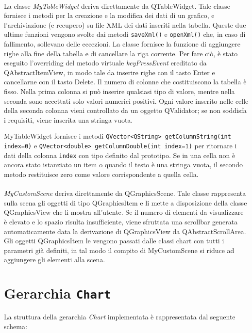 \documentclass[a4paper,10pt]{article}
\begin{document}
\paragraph{}
La classe \emph{MyTableWidget} deriva direttamente da QTableWidget. Tale classe fornisce i metodi per la creazione e la modifica dei dati di un grafico, e l'archiviazione (e recupero) su file XML dei dati inseriti nella tabella. Queste due ultime funzioni vengono svolte dai metodi \texttt{saveXml()} e \texttt{openXml()} che, in caso di fallimento, sollevano delle eccezioni. La classe fornisce la funzione di aggiungere righe alla fine della tabella e di cancellare la riga corrente. Per fare ciò, è stato eseguito l'overriding del metodo virtuale \emph{keyPressEvent} ereditato da QAbstractItemView, in modo tale da inserire righe con il tasto Enter e cancellarne con il tasto Delete. Il numero di colonne che costituiscono la tabella è fisso. Nella prima colonna si può inserire qualsiasi tipo di valore, mentre nella seconda sono accettati solo valori numerici positivi. Ogni valore inserito nelle celle della seconda colonna vieni controllato da un oggetto QValidator; se non soddisfa i requisiti, viene inserita una stringa vuota.

MyTableWidget fornisce i metodi \texttt{QVector<QString> getColumnString(int index=0)} e \texttt{QVector<double> getColumnDouble(int index=1)} per ritornare i dati della colonna \texttt{index} con tipo definito dal prototipo. Se in una cella non è ancora stato istanziato un item o quando il testo è una stringa vuota, il secondo metodo restituisce zero come valore corrispondente a quella cella.

\paragraph{}
\emph{MyCustomScene} deriva direttamente da QGraphicsScene. Tale classe rappresenta sulla scena gli oggetti di tipo QGraphicsItem e li mette a disposizione della classe QGraphicsView che li mostra all'utente. Se il numero di elementi da visualizzare è elevato e lo spazio risulta insufficiente, viene sfruttata una scrollbar generata automaticamente data la derivazione di QGraphicsView da QAbstractScrollArea. Gli oggetti QGraphicsItem le vengono passati dalle classi chart con tutti i parametri già definiti, in tal modo il compito di MyCustomScene si riduce ad aggiungere gli elementi alla scena.

\newpage
\section{Gerarchia \texttt{Chart}}
La struttura della gerarchia \emph{Chart} implementata è rappresentata dal seguente schema:
\end{document}
